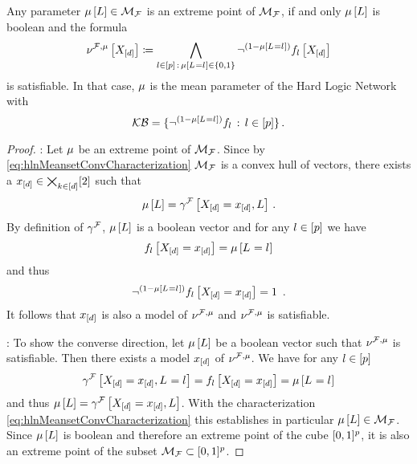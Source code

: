 \begin{theorem}\label{the:extremeCharacterizationHLN}
	Any parameter $\mu\left[L\right]\in\mathcal{M}_{\mathcal{F}}$ is an extreme point of $\mathcal{M}_{\mathcal{F}}$, if and only $\mu\left[L\right]$ is boolean and the formula
			\[ \nu^{\mathcal{F},\mu}\left[X_{[d]}\right] \coloneqq \bigwedge_{l\in[p] \, : \, \mu\left[L_{}=l_{}\right]\in\{0,1\}}
		\lnot^{(1-\mu\left[L_{}=l_{}\right])} f_{l}\left[X_{[d]}\right] \]
	is satisfiable.
	In that case, $\mu$ is the mean parameter of the Hard Logic Network with 
		\[ \mathcal{KB}=\{\lnot^{(1-\mu\left[L_{}=l_{}\right])} f_{l} \, : \, l\in[p] \} \, . \]
\end{theorem}
\begin{proof}
	\proofrightsymbol: Let $\mu$ be an extreme point of $\mathcal{M}_{\mathcal{F}}$. 
		Since by \eqref{eq:hlnMeansetConvCharacterization} $\mathcal{M}_{\mathcal{F}}$ is a convex hull of vectors, there exists a $x_{[d]}\in\bigtimes_{k\in[d]}[2]$ such that
			\[ \mu\left[L\right] = \gamma^{\mathcal{F}}\left[X_{[d]}=x_{[d]},L\right]  \, . \]
		By definition of $\gamma^{\mathcal{F}}$, $\mu\left[L\right]$ is a boolean vector and for any $l\in[p]$ we have
			\[ f_{l}\left[X_{[d]}=x_{[d]}\right] = \mu\left[L_{}=l_{}\right] \]
		and thus
			\[ \lnot^{(1-\meanparamat{\indexedselvariable})} \enumformulaat{\indexedshortcatvariables} = 1 \, .  \]
		It follows that $x_{[d]}$ is also a model of $\nu^{\mathcal{F},\mu}$ and $\nu^{\mathcal{F},\mu}$ is satisfiable.
			
	\proofleftsymbol: To show the converse direction, let $\mu\left[L\right]$ be a boolean vector such that $\nu^{\mathcal{F},\mu}$ is satisfiable.
		Then there exists a model $x_{[d]}$ of $\nu^{\mathcal{F},\mu}$.
		We have for any $l\in[p]$ 
			\[ \gamma^{\mathcal{F}}\left[X_{[d]}=x_{[d]},L_{}=l_{}\right] =  f_{l}\left[X_{[d]}=x_{[d]}\right] = \mu\left[L_{}=l_{}\right] \]
		and thus $\mu\left[L\right]=\gamma^{\mathcal{F}}\left[X_{[d]}=x_{[d]},L\right]$.
		With the characterization \eqref{eq:hlnMeansetConvCharacterization} this establishes in particular $\mu\left[L\right]\in\mathcal{M}_{\mathcal{F}}$.		
		Since $\mu\left[L\right]$ is boolean and therefore an extreme point of the cube $[0,1]^{p}$, it is also an extreme point of the subset $\mathcal{M}_{\mathcal{F}}\subset[0,1]^{p}$.
\end{proof}


